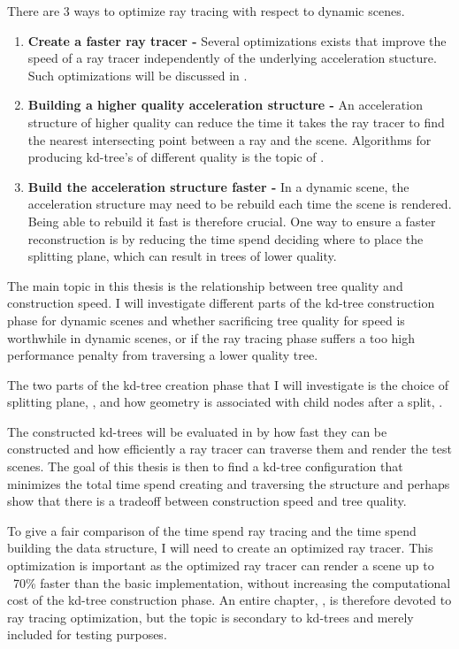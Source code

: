 There are 3 ways to optimize ray tracing with respect to dynamic
scenes. 

\begin{enumerate}
  \item \textbf{Create a faster ray tracer -} Several optimizations
    exists that improve the speed of a ray tracer independently of the
    underlying acceleration stucture. Such optimizations will be
    discussed in .
  \item \textbf{Building a higher quality acceleration structure -} An
    acceleration structure of higher quality can reduce the time it
    takes the ray tracer to find the nearest intersecting point
    between a ray and the scene. Algorithms for producing kd-tree's
    of different quality is the topic of
    .
  \item \textbf{Build the acceleration structure faster -} In a
    dynamic scene, the acceleration structure may need to be rebuild
    each time the scene is rendered. Being able to rebuild it fast is
    therefore crucial. One way to ensure a faster reconstruction is by
    reducing the time spend deciding where to place the splitting
    plane, which can result in trees of lower quality.
\end{enumerate}

The main topic in this thesis is the relationship between tree quality
and construction speed. I will investigate different parts of the
kd-tree construction phase for dynamic scenes and whether sacrificing
tree quality for speed is worthwhile in dynamic scenes, or if the ray
tracing phase suffers a too high performance penalty from traversing a
lower quality tree.

The two parts of the kd-tree creation phase that I will investigate is
the choice of splitting plane, , and
how geometry is associated with child nodes after a split,
.

The constructed kd-trees will be evaluated in 
by how fast they can be constructed and how efficiently a ray tracer
can traverse them and render the test scenes. The goal of this thesis
is then to find a kd-tree configuration that minimizes the total time
spend creating and traversing the structure and perhaps show that
there is a tradeoff between construction speed and tree quality.

To give a fair comparison of the time spend ray tracing and the time
spend building the data structure, I will need to create an optimized
ray tracer. This optimization is important as the optimized ray tracer
can render a scene up to ~70\% faster than the basic implementation,
without increasing the computational cost of the kd-tree construction
phase. An entire chapter, , is therefore
devoted to ray tracing optimization, but the topic is secondary to
kd-trees and merely included for testing purposes.

